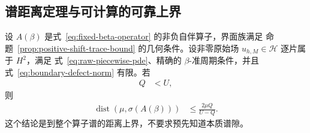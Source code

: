 \subsection{谱距离定理与可计算的可靠上界}

\begin{theorem}[原始界面缺陷的谱距离界]
  \label{thm:resolvent-spectral-distance}
  设 $A(\beta)$ 是式~\eqref{eq:fixed-beta-operator} 的非负自伴算子，界面族满足
  命题~\ref{prop:positive-shift-trace-bound} 的几何条件。设非零原始场
  $u_{h,M}\in\mathcal H$ 逐片属于 $H^2$，满足
  式~\eqref{eq:raw-piecewise-pde}、精确的 $\beta$-准周期条件，并且
  式~\eqref{eq:boundary-defect-norm} 有限。若
  \begin{align}
    Q&<U,
    \label{eq:positive-resolvent-denominator}
  \end{align}
  则
  \begin{align}
    \operatorname{dist}\!\left(\mu,\sigma(A(\beta))\right)
    &\leq\frac{2\mu Q}{U-Q}.
    \label{eq:resolvent-spectral-distance-bound}
  \end{align}
  这个结论是到整个算子谱的距离上界，不要求预先知道本质谱隙。
\end{theorem}

